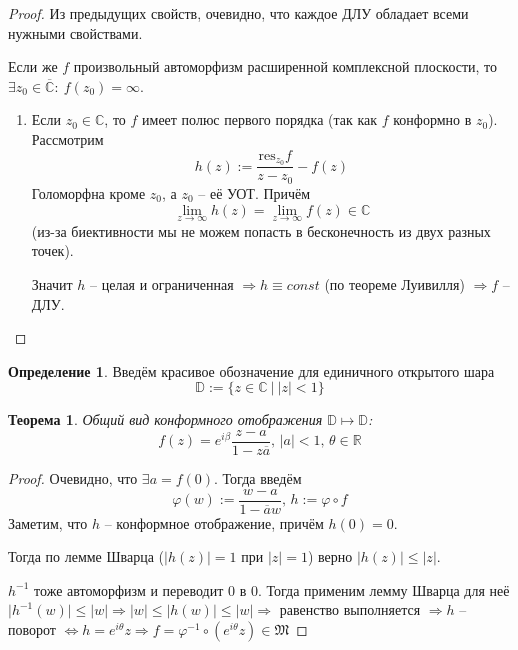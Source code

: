\documentclass[a4paper,12pt]{article}
\renewcommand{\phi}{\ensuremath{\varphi}}
\renewcommand{\leq}{\ensuremath{\leqslant}}
\theoremstyle{plain}
\newtheorem{theorem}{Теорема}[section]
\theoremstyle{definition}
\newtheorem{definition}{Определение}[section]
\theoremstyle{remark}
\begin{document}
\begin{proof}
	Из предыдущих свойств, очевидно, что каждое ДЛУ обладает всеми нужными свойствами.

	Если же $f$ произвольный автоморфизм расширенной комплексной плоскости, то $\exists z_0 \in \overline{\mathbb{C}} :\: f(z_0) = \infty$. 

	\begin{enumerate}
		\item Если $z_0 \in \mathbb{C}$, то $f$ имеет полюс первого порядка (так как $f$ конформно в $z_0$). Рассмотрим
		\[
			h(z) := \frac{\text{res}_{z_0}f}{z - z_0} - f(z)
		\]
		Голоморфна кроме $z_0$, а $z_0$ -- её УОТ. Причём
		\[
			\lim_{z \to \infty}h(z) = \lim_{z \to \infty}f(z) \in \mathbb{C}
		\]
		(из-за биективности мы не можем попасть в бесконечность из двух разных точек).

		Значит $h$ -- целая и ограниченная $\Rightarrow h \equiv const$ (по теореме Луивилля) $\Rightarrow f$ -- ДЛУ. 
	\end{enumerate}
\end{proof}

\begin{definition}
	Введём красивое обозначение для единичного открытого шара
	\[
		\mathbb{D} := \{z \in \mathbb{C} \:\vert\: \vert z\vert < 1\}
	\]
\end{definition}

\begin{theorem}
	Общий вид конформного отображения $\mathbb{D} \mapsto \mathbb{D}$:
	\[
		f(z) = e^{i\beta}\frac{z - a}{1 - z\overline{a}},\, \vert a\vert < 1,\, \theta \in \mathbb{R}
	\]
\end{theorem}

\begin{proof}
	Очевидно, что $\exists a = f(0)$. Тогда введём
	\[
		\phi(w) := \frac{w - a}{1 - \overline{a}w},\, h := \phi\circ f
	\]
	Заметим, что $h$ -- конформное отображение, причём $h(0) = 0$.

	Тогда по лемме Шварца ($\vert h(z)\vert = 1$ при $\vert z\vert = 1$) верно $\vert h(z)\vert\leq\vert z\vert$.

	$h^{-1}$ тоже автоморфизм и переводит $0$ в $0$. Тогда применим лемму Шварца для неё $\vert h^{-1}(w)\vert \leq \vert w\vert \Rightarrow \vert w\vert \leq \vert h(w)\vert \leq \vert w\vert \Rightarrow$ равенство выполняется $\Rightarrow h$ -- поворот $\Leftrightarrow h = e^{i\theta}z \Rightarrow f = \phi^{-1}\circ(e^{i\theta}z) \in \mathfrak{M}$
\end{proof}
\end{document}
